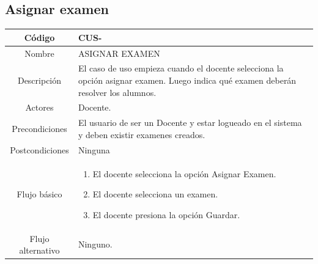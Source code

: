 \clearpage
\subsection{Asignar examen}
\begin{longtable}{|c|L{10cm}|}
	\toprule[0.8mm]
	Código &  CUS-\casodeuso\\  \midrule
	Nombre &  ASIGNAR EXAMEN\\  \midrule
	Descripción &  El caso de uso empieza cuando el docente selecciona la opción asignar examen. Luego indica qué examen deberán resolver los alumnos.\\  \midrule
	Actores &  Docente.\\  \midrule
	Precondiciones &  El usuario de ser un Docente y estar logueado en el sistema y deben existir examenes creados.\\  \midrule
	Postcondiciones &  Ninguna\\  \midrule
	Flujo básico &    \begin{enumerate}
		\item El docente selecciona la opción Asignar Examen.
		\item El docente selecciona un examen.
		\item El docente presiona la opción Guardar.
	\end{enumerate}  \\ \midrule
	Flujo alternativo & Ninguno. \\ \bottomrule[0.8mm]
\end{longtable}

\clearpage
